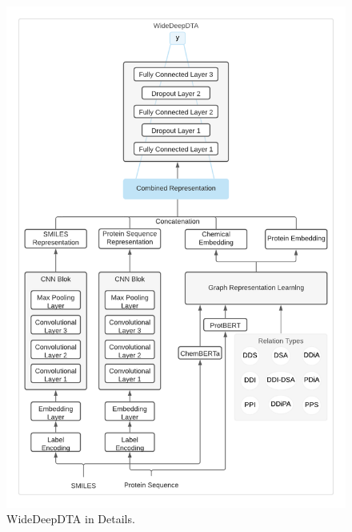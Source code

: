 \begin{figure}
    \centering
        \includegraphics[width=\linewidth]{chapters/materials_and_methods/figures/WiderDeepDTA Model.png}
    \caption{WideDeepDTA in Details.}
    \label{fig:widedeepdtamodel}
\end{figure}